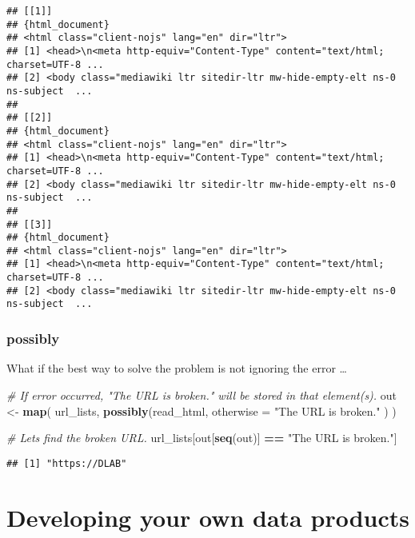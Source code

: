\documentclass[
]{book}
\newenvironment{Shaded}{\begin{snugshade}}{\end{snugshade}}
\newcommand{\CommentTok}[1]{\textcolor[rgb]{0.56,0.35,0.01}{\textit{#1}}}
\newcommand{\DataTypeTok}[1]{\textcolor[rgb]{0.13,0.29,0.53}{#1}}
\newcommand{\KeywordTok}[1]{\textcolor[rgb]{0.13,0.29,0.53}{\textbf{#1}}}
\newcommand{\NormalTok}[1]{#1}
\newcommand{\OperatorTok}[1]{\textcolor[rgb]{0.81,0.36,0.00}{\textbf{#1}}}
\newcommand{\StringTok}[1]{\textcolor[rgb]{0.31,0.60,0.02}{#1}}
\begin{document}
\begin{verbatim}
## [[1]]
## {html_document}
## <html class="client-nojs" lang="en" dir="ltr">
## [1] <head>\n<meta http-equiv="Content-Type" content="text/html; charset=UTF-8 ...
## [2] <body class="mediawiki ltr sitedir-ltr mw-hide-empty-elt ns-0 ns-subject  ...
## 
## [[2]]
## {html_document}
## <html class="client-nojs" lang="en" dir="ltr">
## [1] <head>\n<meta http-equiv="Content-Type" content="text/html; charset=UTF-8 ...
## [2] <body class="mediawiki ltr sitedir-ltr mw-hide-empty-elt ns-0 ns-subject  ...
## 
## [[3]]
## {html_document}
## <html class="client-nojs" lang="en" dir="ltr">
## [1] <head>\n<meta http-equiv="Content-Type" content="text/html; charset=UTF-8 ...
## [2] <body class="mediawiki ltr sitedir-ltr mw-hide-empty-elt ns-0 ns-subject  ...
\end{verbatim}

\hypertarget{possibly}{%
\subsubsection{possibly}\label{possibly}}

What if the best way to solve the problem is not ignoring the error \ldots{}

\begin{Shaded}
\begin{Highlighting}[]
\CommentTok{\# If error occurred, "The URL is broken." will be stored in that element(s).}
\NormalTok{out \textless{}{-}}\StringTok{ }\KeywordTok{map}\NormalTok{(}
\NormalTok{  url\_lists,}
  \KeywordTok{possibly}\NormalTok{(read\_html,}
    \DataTypeTok{otherwise =} \StringTok{"The URL is broken."}
\NormalTok{  )}
\NormalTok{)}

\CommentTok{\# Let\textquotesingle{}s find the broken URL.}
\NormalTok{url\_lists[out[}\KeywordTok{seq}\NormalTok{(out)] }\OperatorTok{==}\StringTok{ "The URL is broken."}\NormalTok{]}
\end{Highlighting}
\end{Shaded}

\begin{verbatim}
## [1] "https://DLAB"
\end{verbatim}

\hypertarget{developing-your-own-data-products}{%
\section{Developing your own data products}\label{developing-your-own-data-products}}
\end{document}
